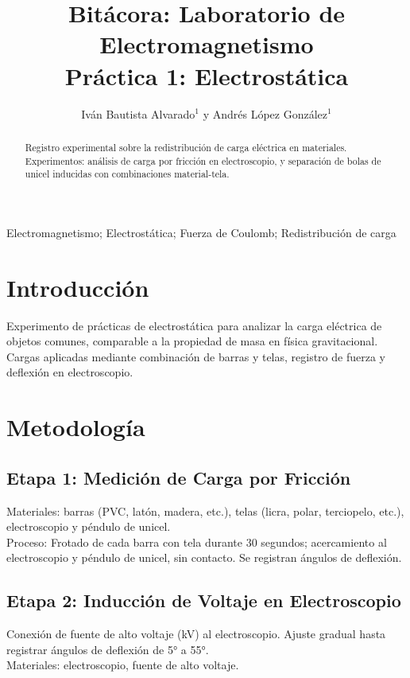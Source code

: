 \documentclass[article,12pt]{elsarticle}
\begin{document}
\begin{frontmatter}
    \title{Bitácora: Laboratorio de Electromagnetismo \\ Práctica 1: Electrostática}
    \author{Iván Bautista Alvarado$^1$ y Andrés López González$^1$}
    \address{$^1$ Facultad de Ciencias, Universidad Nacional Autónoma de México, M\'exico CDMX.}
    \begin{abstract}
    Registro experimental sobre la redistribución de carga eléctrica en materiales. Experimentos: análisis de carga por fricción en electroscopio, y separación de bolas de unicel inducidas con combinaciones material-tela. 
    \end{abstract}
    \begin{keyword}
    Electromagnetismo; Electrostática; Fuerza de Coulomb; Redistribución de carga
    \end{keyword}
\end{frontmatter}

\section{Introducción}
Experimento de prácticas de electrostática para analizar la carga eléctrica de objetos comunes, comparable a la propiedad de masa en física gravitacional. Cargas aplicadas mediante combinación de barras y telas, registro de fuerza y deflexión en electroscopio.

\section{Metodología}
\subsection{Etapa 1: Medición de Carga por Fricción}
Materiales: barras (PVC, latón, madera, etc.), telas (licra, polar, terciopelo, etc.), electroscopio y péndulo de unicel. \\
Proceso: Frotado de cada barra con tela durante 30 segundos; acercamiento al electroscopio y péndulo de unicel, sin contacto. Se registran ángulos de deflexión.

\subsection{Etapa 2: Inducción de Voltaje en Electroscopio}
Conexión de fuente de alto voltaje (kV) al electroscopio. Ajuste gradual hasta registrar ángulos de deflexión de 5° a 55°. \\
Materiales: electroscopio, fuente de alto voltaje.
\end{document}
